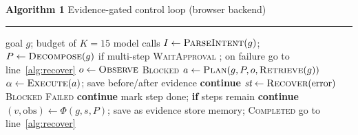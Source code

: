 \documentclass[varwidth=3.5in,border=4pt]{standalone}
\begin{document}
\footnotesize
\textbf{Algorithm 1} Evidence-gated control loop (browser backend)\par\vspace{2pt}\hrule\vspace{2pt}
\begin{algorithmic}[1]
\Require goal $g$; budget of $K{=}15$ model calls
\State $I \gets \Call{ParseIntent}{g}$; $P \gets \Call{Decompose}{g}$ if multi-step
 \Return \textsc{WaitApproval} \EndIf
\State {}; on failure go to line~\ref{alg:recover}
\Loop
  \State $o \gets \Call{Observe}{}$ 
   \Return \textsc{Blocked}  \label{alg:beta}
  \EndIf
  \State $a \gets \Call{Plan}{g, P, o, \textsc{Retrieve}(g)}$ 
  \State $\alpha \gets \Call{Execute}{a}$; save before/after evidence
     \textbf{continue} \EndIf
    \State $\textit{st} \gets \Call{Recover}{\text{error}}$ \label{alg:recover}
     \Return \textsc{Blocked} \EndIf
     \Return \textsc{Failed} \EndIf
    \State \textbf{continue} 
  \EndIf
   mark step done; \textbf{if} steps remain \textbf{continue} \EndIf
    \State $(v, \text{obs}) \gets \Phi(g, s, P)$; save as evidence \label{alg:phi}
     store memory; \Return \textsc{Completed} \EndIf
  \EndIf
   go to line~\ref{alg:recover}  \EndIf
\EndLoop
\end{algorithmic}
\end{document}
